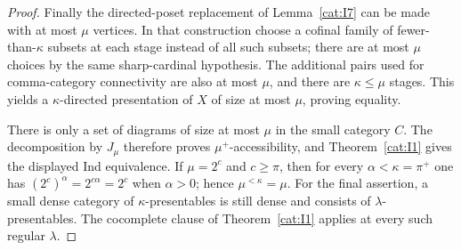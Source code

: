 \begin{proof}
Finally the directed-poset replacement of Lemma~\ref{cat:I7} can be
made with at most $\mu$ vertices.  In that construction choose a
cofinal family of fewer-than-$\kappa$ subsets at each stage instead
of all such subsets; there are at most $\mu$ choices by the same
sharp-cardinal hypothesis.  The additional pairs used for comma-category
connectivity are also at most $\mu$, and there are $\kappa\leq\mu$
stages.  This yields a $\kappa$-directed presentation of $X$ of size
at most $\mu$, proving equality.

There is only a set of diagrams of size at most $\mu$ in the small
category $C$.  The decomposition by $J_\mu$ therefore proves
$\mu^+$-accessibility, and Theorem~\ref{cat:I1} gives the displayed
Ind equivalence.  If $\mu=2^c$ and $c\geq\pi$, then for every
$\alpha<\kappa=\pi^+$ one has
$(2^c)^\alpha=2^{c\alpha}=2^c$ when $\alpha>0$; hence
$\mu^{<\kappa}=\mu$.
For the final assertion, a small dense category of
$\kappa$-presentables is still dense and consists of
$\lambda$-presentables.  The cocomplete clause of
Theorem~\ref{cat:I1} applies at every such regular $\lambda$.
\end{proof}

